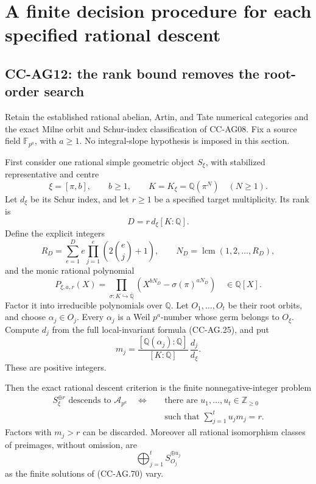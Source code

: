 \section{A finite decision procedure for each specified rational descent}

\subsection{CC-AG12: the rank bound removes the root-order search}

Retain the established rational abelian, Artin, and Tate
numerical categories and the exact Milne orbit and
Schur-index classification of CC-AG08.  Fix a source
field \(\mathbb F_{p^a}\), with \(a\ge1\).
No integral-slope hypothesis is imposed in this section.

First consider one rational simple geometric object
\(S_\xi\), with stabilized representative and centre
\[
         \xi=[\pi,b],\qquad b\ge1,\qquad
         K=K_\xi=\mathbb Q(\pi^N)\quad(N\ge1).
                                                               \tag{CC-AG.65}
\]
Let \(d_\xi\) be its Schur index, and let \(r\ge1\)
be a specified target multiplicity.  Its rank is
\[
                         D=r\,d_\xi[K:\mathbb Q].
                                                               \tag{CC-AG.66}
\]
Define the explicit integers
\[
 R_D=\sum_{e=1}^{D}e\prod_{j=1}^{e}
                           \left(2\binom ej+1\right),
       \qquad N_D=\operatorname{lcm}(1,2,\ldots,R_D),
                                                               \tag{CC-AG.67}
\]
and the monic rational polynomial
\[
 P_{\xi,a,r}(X)=
   \prod_{\sigma:K\hookrightarrow\overline{\mathbb Q}}
       \left(X^{bN_D}-\sigma(\pi)^{aN_D}\right)
                            \quad\in\mathbb Q[X].             \tag{CC-AG.68}
\]
Factor it into irreducible polynomials over \(\mathbb Q\).
Let \(O_1,\ldots,O_t\) be their root orbits, and choose
\(\alpha_j\in O_j\).  Every \(\alpha_j\) is a Weil
\(p^a\)-number whose germ belongs to \(O_\xi\).
Compute \(d_j\) from the full local-invariant formula
(CC-AG.25), and put
\[
        m_j=
          \frac{[\mathbb Q(\alpha_j):\mathbb Q]}
               {[K:\mathbb Q]}\,
          \frac{d_j}{d_\xi}.
                                                               \tag{CC-AG.69}
\]
These are positive integers.

Then the exact rational descent criterion is the finite
nonnegative-integer problem
\[
 \begin{split}
 S_\xi^{\oplus r}\text{ descends to }\mathcal A_{p^a}
   \quad\Longleftrightarrow\quad
   &\text{there are }u_1,\ldots,u_t\in\mathbb Z_{\ge0}\\
   &\text{such that }\sum_{j=1}^{t}u_jm_j=r.
 \end{split}                                                  \tag{CC-AG.70}
\]
Factors with \(m_j>r\) can be discarded.
Moreover all rational isomorphism classes of preimages,
without omission, are
\[
                         \bigoplus_{j=1}^{t}
                                    S_{O_j}^{\oplus u_j}
                                                               \tag{CC-AG.71}
\]
as the finite solutions of (CC-AG.70) vary.

